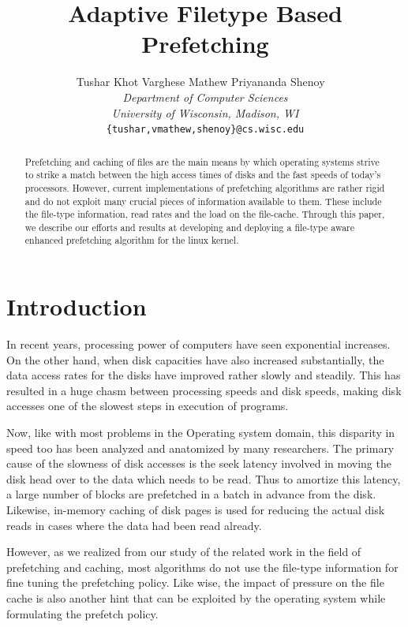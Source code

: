 \documentclass[twocolumn,10pt]{article}
\title{\bf \textsf{Adaptive Filetype Based Prefetching}}
\author{ Tushar Khot \hspace{20pt} Varghese Mathew \hspace{20pt}  Priyananda Shenoy \
\\
       {\em \normalsize Department of Computer Sciences}\\
       {\em \normalsize University of Wisconsin, Madison, WI}\\
       {\tt \normalsize \{tushar,vmathew,shenoy\}@cs.wisc.edu}}
\begin{document}
\date{}
\raggedbottom

\maketitle

\pagestyle{plain}\setlength{\footskip}{25pt}

\onehalfspacing

\begin{abstract}
\small
Prefetching and caching of files are the main means by which operating 
systems strive to strike a match between the high access times of disks
and the fast speeds of today's processors. However, 
current implementations of prefetching algorithms are rather rigid and
do not exploit many crucial pieces of information available to them.
These include the file-type information, read rates and the load on the file-cache.
Through this paper, we describe our efforts and results at developing
and deploying a file-type aware enhanced prefetching algorithm for the
linux kernel.
\end{abstract}

\section{Introduction}
In recent years, processing power of computers have seen exponential
increases. On the other hand, when disk capacities have also increased
substantially, the data access rates for the disks have improved rather
slowly and steadily. This has resulted in a huge chasm between processing
speeds and disk speeds, making disk accesses one of the slowest steps in
execution of programs.

Now, like with most problems in the Operating system domain, this 
disparity in speed too has been analyzed and anatomized by many 
researchers. The primary cause of the slowness of disk accesses is the
seek latency involved in moving the disk head over to the data which 
needs to be read. Thus to amortize this latency, a large number of blocks 
are prefetched in a batch in advance from the disk. Likewise, in-memory
caching of disk pages is used for reducing the actual disk reads in cases
where the data had been read already.

However, as we realized from our study of the related work in the field of
prefetching and caching, most algorithms do not use the file-type information 
for fine tuning the prefetching policy. Like wise, the impact of pressure on 
the file cache is also another hint that can be exploited
by the operating system while formulating the prefetch policy.
\end{document}
